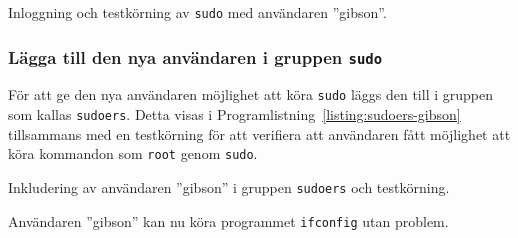 \begin{listing}[H]
\caption{Inloggning och testkörning av \texttt{sudo} med användaren ''gibson''.}
\label{listing:su-gibson}
\end{listing}


\subsubsection{Lägga till den nya användaren i gruppen \texttt{sudo}}
För att ge den nya användaren möjlighet att köra \texttt{sudo} läggs den till i
gruppen som kallas \texttt{sudoers}. Detta visas i
Programlistning~\ref{listing:sudoers-gibson} tillsammans med en testkörning för
att verifiera att användaren fått möjlighet att köra kommandon som
\texttt{root} genom \texttt{sudo}.

\begin{listing}[H]
\caption{Inkludering av användaren ''gibson'' i gruppen \texttt{sudoers} och testkörning.}
\label{listing:sudoers-gibson}
\end{listing}


Användaren ''gibson'' kan nu köra programmet \texttt{ifconfig} utan problem.
